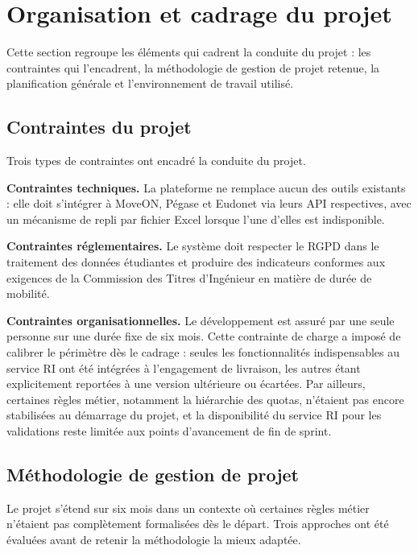 \section{Organisation et cadrage du projet}

Cette section regroupe les éléments qui cadrent la conduite du projet : les contraintes qui l'encadrent, la méthodologie de gestion de projet retenue, la planification générale et l'environnement de travail utilisé.

\subsection{Contraintes du projet}
\label{subsec:contraintes-projet}

Trois types de contraintes ont encadré la conduite du projet.

\textbf{Contraintes techniques.} La plateforme ne remplace aucun des outils existants : elle doit s'intégrer à MoveON, Pégase et Eudonet via leurs API respectives, avec un mécanisme de repli par fichier Excel lorsque l'une d'elles est indisponible.

\textbf{Contraintes réglementaires.} Le système doit respecter le RGPD dans le traitement des données étudiantes et produire des indicateurs conformes aux exigences de la Commission des Titres d'Ingénieur en matière de durée de mobilité.

\textbf{Contraintes organisationnelles.} Le développement est assuré par une seule personne sur une durée fixe de six mois. Cette contrainte de charge a imposé de calibrer le périmètre dès le cadrage : seules les fonctionnalités indispensables au service RI ont été intégrées à l'engagement de livraison, les autres étant explicitement reportées à une version ultérieure ou écartées. Par ailleurs, certaines règles métier, notamment la hiérarchie des quotas, n'étaient pas encore stabilisées au démarrage du projet, et la disponibilité du service RI pour les validations reste limitée aux points d'avancement de fin de sprint.

\subsection{Méthodologie de gestion de projet}

Le projet s'étend sur six mois dans un contexte où certaines règles métier
n'étaient pas complètement formalisées dès le départ. Trois approches ont été
évaluées avant de retenir la méthodologie la mieux adaptée.

